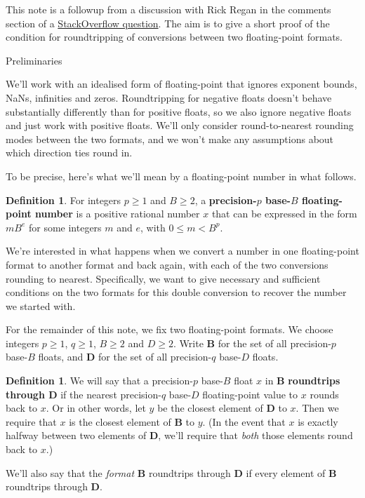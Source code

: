 \documentclass{article}
\theoremstyle{plain}
\theoremstyle{definition}
\newtheorem{definition}[lemma]{Definition}
\begin{document}
This note is a followup from a discussion with Rick Regan in the comments
section of a \href{http://stackoverflow.com/a/35708911/270986}{StackOverflow
  question}. The aim is to give a short proof of the condition for
roundtripping of conversions between two floating-point formats.

\begin{section}{Preliminaries}

We'll work with an idealised form of floating-point that ignores
exponent bounds, NaNs, infinities and zeros. Roundtripping for negative floats
doesn't behave substantially differently than for positive floats, so we also
ignore negative floats and just work with positive floats. We'll only consider
round-to-nearest rounding modes between the two formats, and we won't make any
assumptions about which direction ties round in.

To be precise, here's what we'll mean by a floating-point number in what
follows.

\begin{definition}
  For integers $p \ge 1$ and $B \ge 2$, a \textbf{precision-$p$ base-$B$
    floating-point number} is a positive rational number $x$ that can be
  expressed in the form $m B^e$ for some integers $m$ and $e$, with $0 \le m <
  B^p$.
\end{definition}

We're interested in what happens when we convert a number in one floating-point
format to another format and back again, with each of the two conversions
rounding to nearest. Specifically, we want to give necessary and sufficient
conditions on the two formats for this double conversion to recover the number
we started with.

For the remainder of this note, we fix two floating-point formats.  We choose
integers $p \ge 1$, $q \ge 1$, $B \ge 2$ and $D\ge 2$. Write $\mathbf B$ for
the set of all precision-$p$ base-$B$ floats, and $\mathbf D$ for the set of
all precision-$q$ base-$D$ floats.

\begin{definition}
  We will say that a precision-$p$ base-$B$ float $x$ in $\mathbf B$
  \textbf{roundtrips through $\mathbf D$} if the nearest precision-$q$ base-$D$
  floating-point value to $x$ rounds back to $x$. Or in other words, let $y$ be
  the closest element of $\mathbf D$ to $x$. Then we require that $x$ is the
  closest element of $\mathbf B$ to $y$. (In the event that $x$ is exactly
  halfway between two elements of $\mathbf D$, we'll require that \emph{both}
  those elements round back to $x$.)

  We'll also say that the \emph{format} $\mathbf B$ roundtrips through $\mathbf
  D$ if every element of $\mathbf B$ roundtrips through $\mathbf D$.
\end{definition}

\end{section}
\end{document}
